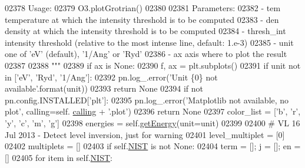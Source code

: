 \begin{DoxyCode}
{{{{{{{{{{{{{{{{{{{{{{02378 \textcolor{stringliteral}{        Usage:}
02379 \textcolor{stringliteral}{            O3.plotGrotrian()}
02380 \textcolor{stringliteral}{        }
02381 \textcolor{stringliteral}{        Parameters:}
02382 \textcolor{stringliteral}{            - tem          temperature at which the intensity threshold is to be computed }
02383 \textcolor{stringliteral}{            - den          density at which the intensity threshold is to be computed }
02384 \textcolor{stringliteral}{            - thresh\_int   intensity threshold (relative to the most intense line, default: 1.e-3)}
02385 \textcolor{stringliteral}{            - unit         one of 'eV' (default), '1/Ang' or 'Ryd'}
02386 \textcolor{stringliteral}{            - ax           axis where to plot the result}
02387 \textcolor{stringliteral}{}
02388 \textcolor{stringliteral}{        """}
02389         \textcolor{keywordflow}{if} ax \textcolor{keywordflow}{is} \textcolor{keywordtype}{None}:
02390             f, ax = plt.subplots()
02391         \textcolor{keywordflow}{if} unit \textcolor{keywordflow}{not} \textcolor{keywordflow}{in} [\textcolor{stringliteral}{'eV'}, \textcolor{stringliteral}{'Ryd'}, \textcolor{stringliteral}{'1/Ang'}]:
02392             pn.log\_.error(\textcolor{stringliteral}{'Unit \{0\} not available'}.format(unit))
02393             \textcolor{keywordflow}{return} \textcolor{keywordtype}{None}
02394         \textcolor{keywordflow}{if} \textcolor{keywordflow}{not} pn.config.INSTALLED[\textcolor{stringliteral}{'plt'}]: 
02395             pn.log\_.error(\textcolor{stringliteral}{'Matplotlib not available, no plot'}, calling=self.
      \hyperlink{classpyneb_1_1core_1_1pynebcore_1_1_atom_a373b7735acf4f528b54bddf373ad67a1}{calling} + \textcolor{stringliteral}{'.plot'})
02396             \textcolor{keywordflow}{return} \textcolor{keywordtype}{None}
02397         color\_list = [\textcolor{stringliteral}{'b'}, \textcolor{stringliteral}{'}\textcolor{stringliteral}{r', '}y', 'c', 'm', 'g']
02398         energies = self.\hyperlink{classpyneb_1_1core_1_1pynebcore_1_1_atom_a9940acb2999e864edf9761d822e65d7f}{getEnergy}(unit=unit)
02399          
02400         \textcolor{comment}{# VL 16 Jul 2013 - Detect level inversion, just for warning        }
02401         level\_multiplet = [0]
02402         multiplets = []
02403         \textcolor{keywordflow}{if} self.\hyperlink{classpyneb_1_1core_1_1pynebcore_1_1_atom_a65e03e79fb1cde1b00580042f3303538}{NIST} \textcolor{keywordflow}{is} \textcolor{keywordflow}{not} \textcolor{keywordtype}{None}:
02404             term = []; j = []; en = []
02405             \textcolor{keywordflow}{for} item \textcolor{keywordflow}{in} self.\hyperlink{classpyneb_1_1core_1_1pynebcore_1_1_atom_a65e03e79fb1cde1b00580042f3303538}{NIST}:
}}}}}}}}}}}}}}}}}}}}}}
\end{DoxyCode}
